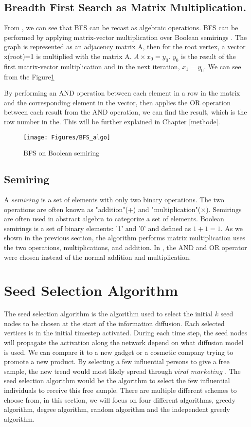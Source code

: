 \subsection{Breadth First Search as Matrix Multiplication.} \label{BFS as Matrix}
From  \cite{AlgoToMath}, we can see that BFS can be recast as algebraic operations. BFS can be performed by applying matrix-vector multiplication over Boolean semirings \cite{HybridBFS2015}. The graph is represented as an adjacency matrix A, then for the root vertex, a vector x(root)=1 is multiplied with the matrix A. $A \times x_0 = y_0$. $y_0$ is the result of the first matrix-vector multiplication and in the next iteration, $x_1 = y_0$. We can see from the Figure\ref{fig:bfsMatrix}

By performing an AND operation between each element in a row in the matrix and the corresponding element in the vector, then applies the OR operation between each result from the AND operation, we can find the result, which is the row number in the. This will be further explained in Chapter \ref{methode}. 

\begin{figure}[!ht]
    \texttt{[image: Figures/BFS\_algo]}
    \caption{BFS on Boolean semiring}
    \label{fig:bfsMatrix}
\end{figure}

\subsection{Semiring}
A $semiring$ is a set of elements with only two binary operations. The two operations are often known as "addition"(+) and "multiplication"($\times$). Semirings are often used in abstract algebra to categorize a set of elements. Boolean semirings is a set of binary elements: '1' and '0' and defined as $1+1=1$.  As we shown in the previous section, the algorithm performs matrix multiplication uses the two operations, multiplications, and addition. In  \cite{HybridBFS2015}, the AND and OR operator were chosen instead of the normal addition and multiplication. 

 
 
\section{Seed Selection Algorithm}
The seed selection algorithm is the algorithm used to select the initial $k$ seed nodes to be chosen at the start of the information diffusion. Each selected vertices is in the initial timestep activated. During each time step, the seed nodes will propagate the activation along the network depend on what diffusion model is used. We can compare it to a new gadget or a cosmetic company trying to promote a new product. By selecting a few influential persons to give a free sample, the new trend would most likely spread through $viral$ $marketing$ \cite{ViralMarketing}. The seed selection algorithm would be the algorithm to select the few influential individuals to receive this free sample. There are multiple different schemes to choose from, in this section, we will focus on four different algorithms, greedy algorithm, degree algorithm, random algorithm and the independent greedy algorithm.

